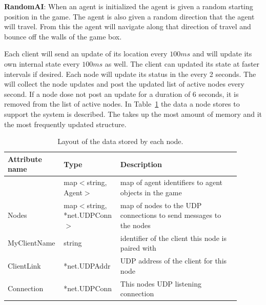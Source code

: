 \noindent \textbf{RandomAI}: When an agent is initialized the agent is given a random starting position in the game. The agent is also given a random direction that the agent will travel. From this the agent will navigate along that direction of travel and bounce off the walls of the game box.

Each client will send an update of its location every $100ms$ and will update its own internal state every $100ms$ as well. The client can updated its state at faster intervals if desired. Each node will update its status in the \kvService every 2 seconds. The \activityServer will collect the node updates and post the updated list of active nodes every second. If a node dose not post an update for a duration of $6$ seconds, it is removed from the list of active nodes. In Table~\ref{table:gamestate-discription} the data a node stores to support the system is described. The \gamestate takes up the most amount of memory and it the most frequently updated structure.

\begin{table}[htb!]
\centering
	\begin{tabular}{p{0.2\linewidth} | p{0.2\linewidth} | p{0.5\linewidth}}
	\textbf{Attribute name} & \textbf{Type} & \textbf{Description} \\ \hline
	\gamestate & map$<$string, Agent$>$ & map of agent identifiers to agent objects in the game \\ \hline
	Nodes & map$<$string, *net.UDPConn$>$ & map of nodes to the UDP connections to send messages to the nodes \\ \hline
	MyClientName & string  & identifier of the client this node is paired with\\  \hline
	ClientLink & *net.UDPAddr & UDP address of the client for this node\\ \hline
	Connection & *net.UDPConn & This nodes UDP listening connection \\ \hline	
	\end{tabular}
	\caption{\label{table:gamestate-discription} Layout of the data stored by each node.}
\end{table}
